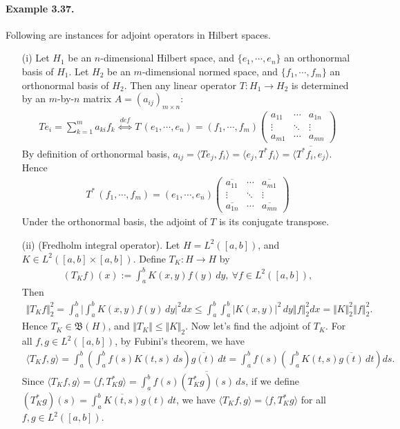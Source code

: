 \documentclass{article}
\begin{document}
\paragraph{Example 3.37.\label{example:3.37}} Following are instances for adjoint operators in Hilbert spaces.
\begin{itemize}
\vspace{0.1cm}
\item[(i)] Let $H_1$ be an $n$-dimensional Hilbert space, and $\{e_1,\cdots,e_n\}$ an orthonormal basis of $H_1$. Let $H_2$ be an $m$-dimensional normed space, and $\{f_1,\cdots,f_m\}$ an orthonormal basis of $H_2$. Then any linear operator $T:H_1\to H_2$ is determined by an $m$-by-$n$ matrix $A=(a_{ij})_{m\times n}$:
\begin{align*}
	Te_i = \sum_{k=1}^m a_{ki}f_k\ \overset{def}{\Leftrightarrow}\ T\,(e_1,\cdots,e_n) = (f_1,\cdots,f_m)\begin{pmatrix}
		a_{11} & \cdots & a_{1n}\\
		\vdots & \ddots & \vdots\\
		a_{m1} & \cdots & a_{mn}
	\end{pmatrix}
\end{align*}
By definition of orthonormal basis, $a_{ij}=\langle Te_j,f_i\rangle = \langle e_j,T^*f_i\rangle = \overline{\langle T^*f_i,e_j\rangle}$. Hence
\begin{align*}
	T^*\,(f_1,\cdots,f_m) = (e_1,\cdots,e_n)\begin{pmatrix}
		\overline{a_{11}} & \cdots & \overline{a_{m1}}\\
		\vdots & \ddots & \vdots\\
		\overline{a_{1n}} & \cdots & \overline{a_{mn}}
	\end{pmatrix}
\end{align*}
Under the orthonormal basis, the adjoint of $T$ is its conjugate transpose.

\item[(ii)] (Fredholm integral operator). Let $H=L^2([a,b])$, and $K\in L^2([a,b]\times[a,b])$. Define $T_K:H\to H$ by
\begin{align*}
	(T_K f)(x):=\int_a^b K(x,y)f(y)\,dy,\ \forall f\in L^2([a,b]),
\end{align*}
Then
\begin{align*}
	\Vert T_Kf\Vert_2^2 = \int_a^b\biggl\vert\int_a^b K(x,y)f(y)\,dy\biggr\vert^2 dx \leq \int_a^b\int_a^b \left\vert K(x,y)\right\vert^2\,dy\left\Vert f\right\Vert_2^2dx = \Vert K\Vert^2_2\left\Vert f\right\Vert^2_2.
\end{align*}
Hence $T_K\in\mathfrak{B}(H)$, and $\Vert T_K\Vert\leq\Vert K\Vert_2$. Now let's find the adjoint of $T_K$. For all $f,g\in L^2([a,b])$, by Fubini's theorem, we have
\begin{align*}
	\langle T_Kf, g\rangle = \int_a^b
	\left(\int_a^b f(s)K(t,s)\,ds\right)\overline{g(t)}\,dt = \int_a^b f(s)\left(\int_a^b K(t,s)\overline{g(t)}\,dt\right)ds.\label{eq:3.3}\tag{3.3}
\end{align*}
Since $\langle T_Kf, g\rangle = \langle f,T_K^*g\rangle = \int_a^b f(s)\overline{(T_K^*g)(s)}\,ds$, if we define $(T_K^*g)(s) = \int_a^b \overline{K(t,s)}g(t)\,dt$, we have $\langle T_Kf,g\rangle = \langle f,T_K^*g\rangle$ for all $f,g\in L^2([a,b])$.
\end{itemize}
\end{document}
